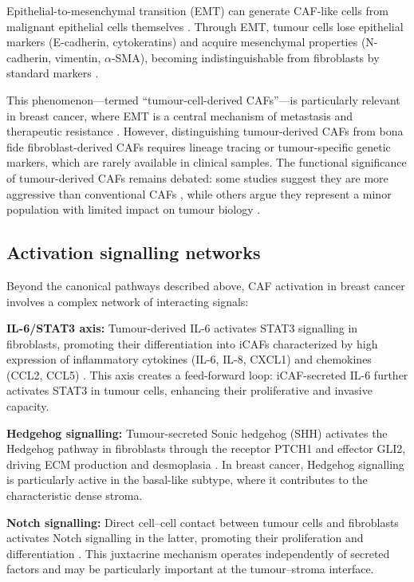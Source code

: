 Epithelial-to-mesenchymal transition (EMT) can generate CAF-like cells from malignant epithelial cells themselves \citep{petersen2003epithelial}. Through EMT, tumour cells lose epithelial markers (E-cadherin, cytokeratins) and acquire mesenchymal properties (N-cadherin, vimentin, $\alpha$-SMA), becoming indistinguishable from fibroblasts by standard markers \citep{kalluri2009emt}.

This phenomenon---termed ``tumour-cell-derived CAFs''---is particularly relevant in breast cancer, where EMT is a central mechanism of metastasis and therapeutic resistance \citep{niegel2018}. However, distinguishing tumour-derived CAFs from bona fide fibroblast-derived CAFs requires lineage tracing or tumour-specific genetic markers, which are rarely available in clinical samples. The functional significance of tumour-derived CAFs remains debated: some studies suggest they are more aggressive than conventional CAFs \citep{chen2014}, while others argue they represent a minor population with limited impact on tumour biology \citep{strell2019}.

\subsection{Activation signalling networks}

Beyond the canonical pathways described above, CAF activation in breast cancer involves a complex network of interacting signals:

\textbf{IL-6/STAT3 axis:} Tumour-derived IL-6 activates STAT3 signalling in fibroblasts, promoting their differentiation into iCAFs characterized by high expression of inflammatory cytokines (IL-6, IL-8, CXCL1) and chemokines (CCL2, CCL5) \citep{erve2024}. This axis creates a feed-forward loop: iCAF-secreted IL-6 further activates STAT3 in tumour cells, enhancing their proliferative and invasive capacity.

\textbf{Hedgehog signalling:} Tumour-secreted Sonic hedgehog (SHH) activates the Hedgehog pathway in fibroblasts through the receptor PTCH1 and effector GLI2, driving ECM production and desmoplasia \citep{rao2006hedgehog}. In breast cancer, Hedgehog signalling is particularly active in the basal-like subtype, where it contributes to the characteristic dense stroma.

\textbf{Notch signalling:} Direct cell--cell contact between tumour cells and fibroblasts activates Notch signalling in the latter, promoting their proliferation and differentiation \citep{strell2019}. This juxtacrine mechanism operates independently of secreted factors and may be particularly important at the tumour--stroma interface.


